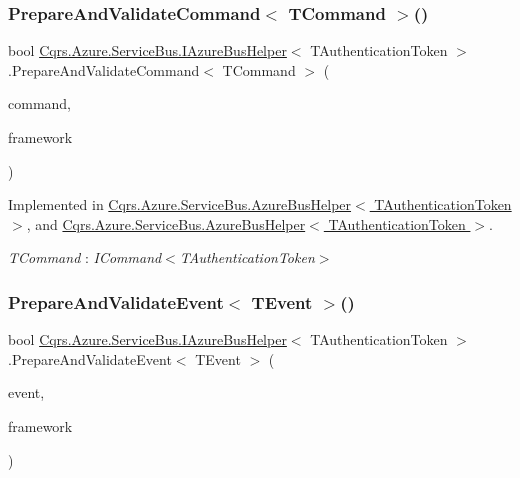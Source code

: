 \subsubsection{\texorpdfstring{Prepare\+And\+Validate\+Command$<$ T\+Command $>$()}{PrepareAndValidateCommand< TCommand >()}}
{\footnotesize\ttfamily bool \hyperlink{interfaceCqrs_1_1Azure_1_1ServiceBus_1_1IAzureBusHelper}{Cqrs.\+Azure.\+Service\+Bus.\+I\+Azure\+Bus\+Helper}$<$ T\+Authentication\+Token $>$.Prepare\+And\+Validate\+Command$<$ T\+Command $>$ (\begin{DoxyParamCaption}\item[{T\+Command}]{command,  }\item[{string}]{framework }\end{DoxyParamCaption})}



Implemented in \hyperlink{classCqrs_1_1Azure_1_1ServiceBus_1_1AzureBusHelper_a4d03f55a58a018fbbf6fd518ad9b24f8_a4d03f55a58a018fbbf6fd518ad9b24f8}{Cqrs.\+Azure.\+Service\+Bus.\+Azure\+Bus\+Helper$<$ T\+Authentication\+Token $>$}, and \hyperlink{classCqrs_1_1Azure_1_1ServiceBus_1_1AzureBusHelper_a4d03f55a58a018fbbf6fd518ad9b24f8_a4d03f55a58a018fbbf6fd518ad9b24f8}{Cqrs.\+Azure.\+Service\+Bus.\+Azure\+Bus\+Helper$<$ T\+Authentication\+Token $>$}.

\begin{Desc}
\item[Type Constraints]\begin{description}
\item[{\em T\+Command} : {\em I\+Command$<$T\+Authentication\+Token$>$}]\end{description}
\end{Desc}
\mbox{\label{interfaceCqrs_1_1Azure_1_1ServiceBus_1_1IAzureBusHelper_ac5cbeb6e8bbdb1a98501f0b746c12abd_ac5cbeb6e8bbdb1a98501f0b746c12abd}} 
\subsubsection{\texorpdfstring{Prepare\+And\+Validate\+Event$<$ T\+Event $>$()}{PrepareAndValidateEvent< TEvent >()}}
{\footnotesize\ttfamily bool \hyperlink{interfaceCqrs_1_1Azure_1_1ServiceBus_1_1IAzureBusHelper}{Cqrs.\+Azure.\+Service\+Bus.\+I\+Azure\+Bus\+Helper}$<$ T\+Authentication\+Token $>$.Prepare\+And\+Validate\+Event$<$ T\+Event $>$ (\begin{DoxyParamCaption}\item[{T\+Event @}]{event,  }\item[{string}]{framework }\end{DoxyParamCaption})}



